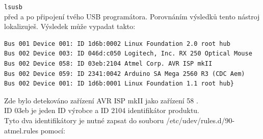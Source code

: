 \verb"lsusb"\\
před a po připojení tvého USB programátora.
Porovnáním výsledků tento nástroj lokalizuješ. Výsledek může vypadat takto:
\vspace*{-.6em}
\begin{footnotesize} \begin{verbatim}
Bus 001 Device 001: ID 1d6b:0002 Linux Foundation 2.0 root hub
Bus 002 Device 003: ID 046d:c050 Logitech, Inc. RX 250 Optical Mouse
Bus 002 Device 058: ID 03eb:2104 Atmel Corp. AVR ISP mkII
Bus 002 Device 059: ID 2341:0042 Arduino SA Mega 2560 R3 (CDC Aem)
Bus 002 Device 001: ID 1d6b:0001 Linux Foundation 1.1 root hub}
\end{verbatim} \end{footnotesize}
\vspace*{-.6em}
Zde bylo detekováno zařízení AVR ISP mkII jako zařízení 58 .\\
ID 03eb je jeden ID výrobce a ID 2104 identifikátor produktu.\\
Tyto dva identifikátory je nutné zapsat do souboru /etc/udev/rules.d/90-atmel.rules pomocí:

